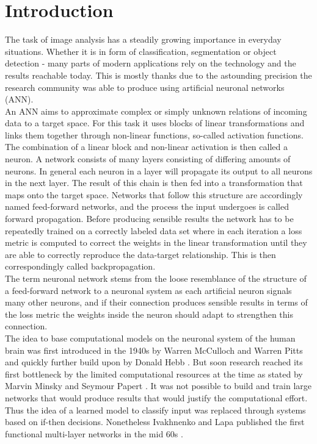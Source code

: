 \documentclass[a4paper,12pt,titlepage,enabledeprecatedfontcommands]{scrreprt}
\begin{document}
\tableofcontents
\listoffigures

\newpage
\setcounter{page}{1}

\chapter{Introduction}
The task of image analysis has a steadily growing importance in everyday situations. Whether it is in form of classification, segmentation or object detection - many parts of modern applications rely on the technology and the results reachable today. This is mostly thanks due to the astounding precision the research community was able to produce using artificial neuronal networks (ANN). \\
An ANN aims to approximate complex or simply unknown relations of incoming data to a target space. For this task it uses blocks of linear transformations and links them together through non-linear functions, so-called activation functions. The combination of a linear block and non-linear activation is then called a neuron. A network consists of many layers consisting of differing amounts of neurons. In general each neuron in a layer will propagate its output to  all neurons in the next layer. The result of this chain is then fed into a transformation that maps onto the target space. Networks that follow this structure are accordingly named feed-forward networks, and the process the input undergoes is called forward propagation. Before producing sensible results the network has to be repeatedly trained on a correctly labeled data set where in each iteration a loss metric is computed to correct the weights in the linear transformation until they are able to correctly reproduce the data-target relationship. This is then correspondingly called backpropagation. \\
The term neuronal network stems from the loose resemblance of the structure of a feed-forward network to a neuronal system as each artificial neuron signals many other neurons, and if their connection produces sensible results in terms of the loss metric the weights inside the neuron should adapt to strengthen this connection. \\
The idea to base computational models on the neuronal system of the human brain was first introduced in the 1940s by Warren McCulloch and Warren Pitts \cite{10.5555/65669.104377} and quickly further build upon by Donald Hebb \cite{hebb-organization-of-behavior-1949}. But soon research reached its first bottleneck by the limited computational resources at the time as stated by Marvin Minsky and Seymour Papert \cite{minsky69perceptrons}. It was not possible to build and train large networks that would produce results that would justify the computational effort. Thus the idea of a learned model to classify input was replaced through systems based on if-then decisions. Nonetheless Ivakhnenko and Lapa published the first functional multi-layer networks in the mid 60s \cite{ivakhnenko1967cybernetics}.\\
\end{document}
